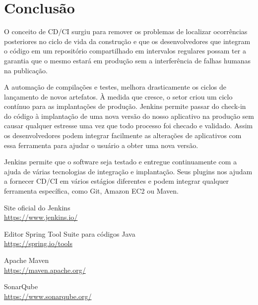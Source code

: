 \documentclass[a4paper,11pt]{article}
\begin{document}
\section{Conclusão}
O conceito de CD/CI surgiu para remover os problemas de localizar ocorrências posteriores no ciclo de vida da construção e que os desenvolvedores que integram o código em um repositório compartilhado em intervalos regulares possam ter a garantia que o mesmo estará em produção sem a interferência de falhas humanas na publicação. 

A automação de compilações e testes, melhora drasticamente os ciclos de lançamento de novos artefatos. À medida que cresce, o setor criou um ciclo contínuo para as implantações de produção. Jenkins permite passar do check-in do código à implantação de uma nova versão do nosso aplicativo na produção sem causar qualquer estresse uma vez que todo processo foi checado e validado. Assim os desenvolvedores podem integrar facilmente as alterações de aplicativos com essa ferramenta para ajudar o usuário a obter uma nova versão. 

Jenkins permite que o software seja testado e entregue continuamente com a ajuda de várias tecnologias de integração e implantação. Seus plugins nos ajudam a fornecer CD/CI em vários estágios diferentes e podem integrar qualquer ferramenta específica, como Git, Amazon EC2 ou Maven. 



\begin{thebibliography}{7}
  Site oficial do Jenkins \\
  \url{https://www.jenkins.io/}

  Editor Spring Tool Suite para códigos Java \\
  \url{https://spring.io/tools}
  
  Apache Maven \\
  \url{https://maven.apache.org/}

  SonarQube \\
  \url{https://www.sonarqube.org/}

  
\end{thebibliography}
\end{document}
